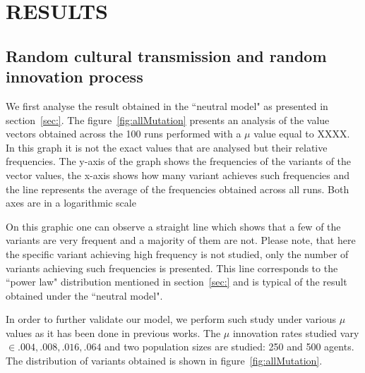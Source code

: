 \documentclass{wscpaperproc}
\begin{document}
\section{RESULTS}
\subsection{Random cultural transmission and random innovation process}

We first analyse the result obtained in the ``neutral model" as presented in section~\ref{sec:}. The figure~\ref{fig:allMutation} presents an analysis of the value vectors obtained across the 100 runs performed with a $\mu$ value equal to XXXX. In this graph it is not the exact values that are analysed but their relative frequencies. The y-axis of the graph shows the frequencies of the variants of the vector values, the x-axis shows how many variant achieves such frequencies and the line represents the average of the frequencies obtained across all runs. Both axes are in a logarithmic scale

On this graphic one can observe a straight line which shows that a few of the variants are very frequent and a majority of them are not. Please note, that here the specific variant achieving high frequency is not studied, only the number of variants achieving such frequencies is presented. This line corresponds to the ``power law" distribution mentioned in section~\ref{sec:} and is typical of the result obtained under the ``neutral model". 

In order to further validate our model, we perform such study under various $\mu$ values as it has been done in previous works. The $\mu$ innovation rates studied vary $\in {.004,.008,.016,.064}$ and two population sizes are studied: 250 and 500 agents. The distribution of variants obtained is shown in figure~\ref{fig:allMutation}.
\end{document}
